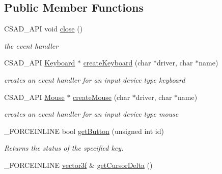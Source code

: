 \subsection*{Public Member Functions}
\begin{DoxyCompactItemize}
\item 
\hypertarget{classcsad_1_1_input_a757f75633c889167613ca0e9d3f3b3ae}{C\-S\-A\-D\-\_\-\-A\-P\-I void \hyperlink{classcsad_1_1_input_a757f75633c889167613ca0e9d3f3b3ae}{close} ()}\label{classcsad_1_1_input_a757f75633c889167613ca0e9d3f3b3ae}

\begin{DoxyCompactList}\small\item\em the event handler \end{DoxyCompactList}\item 
\hypertarget{classcsad_1_1_input_a66e7b00df0774d9f9992dd527d9f804b}{C\-S\-A\-D\-\_\-\-A\-P\-I \hyperlink{classcsad_1_1_keyboard}{Keyboard} $\ast$ \hyperlink{classcsad_1_1_input_a66e7b00df0774d9f9992dd527d9f804b}{create\-Keyboard} (char $\ast$driver, char $\ast$name)}\label{classcsad_1_1_input_a66e7b00df0774d9f9992dd527d9f804b}

\begin{DoxyCompactList}\small\item\em creates an event handler for an input device type keyboard \end{DoxyCompactList}\item 
\hypertarget{classcsad_1_1_input_a152ed3adbe69cc7c6198c8a4fba0929a}{C\-S\-A\-D\-\_\-\-A\-P\-I \hyperlink{classcsad_1_1_mouse}{Mouse} $\ast$ \hyperlink{classcsad_1_1_input_a152ed3adbe69cc7c6198c8a4fba0929a}{create\-Mouse} (char $\ast$driver, char $\ast$name)}\label{classcsad_1_1_input_a152ed3adbe69cc7c6198c8a4fba0929a}

\begin{DoxyCompactList}\small\item\em creates an event handler for an input device type mouse \end{DoxyCompactList}\item 
\hypertarget{classcsad_1_1_input_a2f469ce209550a6dc86f91193fa78d5d}{\-\_\-\-F\-O\-R\-C\-E\-I\-N\-L\-I\-N\-E bool \hyperlink{classcsad_1_1_input_a2f469ce209550a6dc86f91193fa78d5d}{get\-Button} (unsigned int id)}\label{classcsad_1_1_input_a2f469ce209550a6dc86f91193fa78d5d}

\begin{DoxyCompactList}\small\item\em Returns the status of the specified key. \end{DoxyCompactList}\item 
\hypertarget{classcsad_1_1_input_a766f390a9baa2e03d487724d72904551}{\-\_\-\-F\-O\-R\-C\-E\-I\-N\-L\-I\-N\-E \hyperlink{classbt_1_1vector3f}{vector3f} \& \hyperlink{classcsad_1_1_input_a766f390a9baa2e03d487724d72904551}{get\-Cursor\-Delta} ()}\label{classcsad_1_1_input_a766f390a9baa2e03d487724d72904551}


\end{DoxyCompactItemize}
